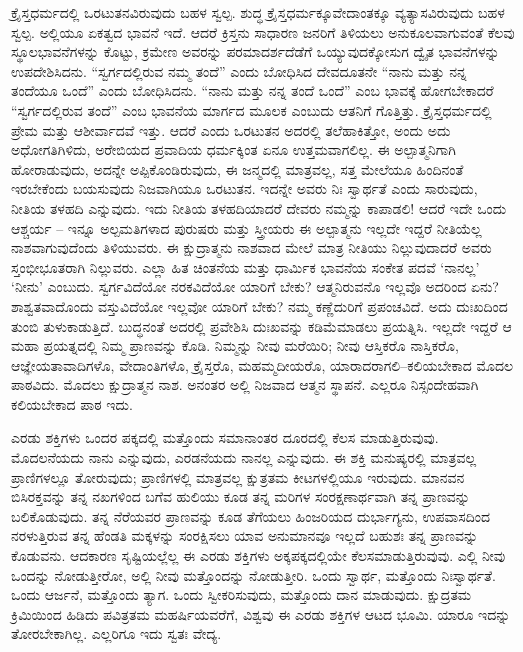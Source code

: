 \vskip 5pt

ಕ್ರೈಸ್ತಧರ್ಮದಲ್ಲಿ ಒರಟುತನವಿರುವುದು ಬಹಳ ಸ್ವಲ್ಪ. ಶುದ್ಧ ಕ್ರೈಸ್ತಧರ್ಮಕ್ಕೂ\break ವೇದಾಂತಕ್ಕೂ ವ್ಯತ್ಯಾಸವಿರುವುದು ಬಹಳ ಸ್ವಲ್ಪ. ಅಲ್ಲಿಯೂ ಏಕತ್ವದ ಭಾವನೆ ಇದೆ. ಆದರೆ ಕ್ರಿಸ್ತನು ಸಾಧಾರಣ ಜನರಿಗೆ ತಿಳಿಯಲು ಅನುಕೂಲವಾಗುವಂತೆ ಕೆಲವು ಸ್ಥೂಲಭಾವನೆಗಳನ್ನು ಕೊಟ್ಟು, ಕ್ರಮೇಣ ಅವರನ್ನು ಪರಮಾದರ್ಶದೆಡೆಗೆ ಒಯ್ಯುವುದಕ್ಕೋಸುಗ ದ್ವೈತ ಭಾವನೆಗಳನ್ನು ಉಪದೇಶಿಸಿದನು. “ಸ್ವರ್ಗದಲ್ಲಿರುವ ನಮ್ಮ ತಂದೆ” ಎಂದು ಬೋಧಿಸಿದ ದೇವದೂತನೇ “ನಾನು ಮತ್ತು ನನ್ನ ತಂದೆಯೂ ಒಂದೆ” ಎಂದು ಬೋಧಿಸಿದನು. “ನಾನು ಮತ್ತು ನನ್ನ ತಂದೆ ಒಂದೆ” ಎಂಬ ಭಾವಕ್ಕೆ ಹೋಗಬೇಕಾದರೆ “ಸ್ವರ್ಗದಲ್ಲಿರುವ ತಂದೆ” ಎಂಬ ಭಾವನೆಯ ಮಾರ್ಗದ ಮೂಲಕ ಎಂಬುದು ಆತನಿಗೆ ಗೊತ್ತಿತ್ತು. ಕ್ರೈಸ್ತಧರ್ಮದಲ್ಲಿ ಪ್ರೇಮ ಮತ್ತು ಆಶೀರ್ವಾದವೆ ಇತ್ತು. ಆದರೆ ಎಂದು ಒರಟುತನ ಅದರಲ್ಲಿ ತಲೆಹಾಕಿತ್ತೋ, ಅಂದು ಅದು ಅಧೋಗತಿಗಿಳಿದು, ಅರೇಬಿಯದ ಪ್ರವಾದಿಯ ಧರ್ಮಕ್ಕಿಂತ ಏನೂ ಉತ್ತಮವಾಗಲಿಲ್ಲ. ಈ ಅಲ್ಪಾತ್ಮನಿಗಾಗಿ ಹೋರಾಡುವುದು, ಅದನ್ನೇ ಅಪ್ಪಿಕೊಂಡಿರುವುದು, ಈ ಜನ್ಮದಲ್ಲಿ ಮಾತ್ರವಲ್ಲ, ಸತ್ತ ಮೇಲೆಯೂ ಹಿಂದಿನಂತೆ ಇರಬೇಕೆಂದು ಬಯಸುವುದು ನಿಜವಾಗಿಯೂ ಒರಟುತನ. ಇದನ್ನೇ ಅವರು ನಿಃ ಸ್ವಾರ್ಥತೆ ಎಂದು ಸಾರುವುದು, ನೀತಿಯ ತಳಹದಿ ಎನ್ನುವುದು. ಇದು ನೀತಿಯ ತಳಹದಿಯಾದರೆ ದೇವರು ನಮ್ಮನ್ನು ಕಾಪಾಡಲಿ! ಆದರೆ ಇದೇ ಒಂದು ಆಶ್ಚರ್ಯ – ಇನ್ನೂ ಅಲ್ಪಮತಿಗಳಾದ ಪುರುಷರು ಮತ್ತು ಸ್ತ್ರೀಯರು ಈ ಅಲ್ಪಾತ್ಮನು ಇಲ್ಲದೇ ಇದ್ದರೆ ನೀತಿಯೆಲ್ಲ ನಾಶವಾಗುವುದೆಂದು ತಿಳಿಯುವರು. ಈ ಕ್ಷುದ್ರಾತ್ಮನು ನಾಶವಾದ ಮೇಲೆ ಮಾತ್ರ ನೀತಿಯು ನಿಲ್ಲುವುದಾದರೆ ಅವರು ಸ್ತಂಭೀಭೂತರಾಗಿ ನಿಲ್ಲುವರು. ಎಲ್ಲಾ ಹಿತ ಚಿಂತನೆಯ ಮತ್ತು ಧಾರ್ಮಿಕ ಭಾವನೆಯ ಸಂಕೇತ ಪದವೆ ‘ನಾನಲ್ಲ’ ‘ನೀನು’ ಎಂಬುದು. ಸ್ವರ್ಗವಿದೆಯೋ ನರಕವಿದೆಯೋ ಯಾರಿಗೆ ಬೇಕು? ಆತ್ಮನಿರುವನೊ ಇಲ್ಲವೊ ಅದರಿಂದ ಏನು? ಶಾಶ್ವತವಾದೊಂದು ವಸ್ತುವಿದೆಯೋ ಇಲ್ಲವೋ ಯಾರಿಗೆ ಬೇಕು? ನಮ್ಮ ಕಣ್ಣೆದುರಿಗೆ ಪ್ರಪಂಚವಿದೆ. ಅದು ದುಃಖದಿಂದ ತುಂಬಿ ತುಳುಕಾಡುತ್ತಿದೆ. ಬುದ್ಧನಂತೆ ಅದರಲ್ಲಿ ಪ್ರವೇಶಿಸಿ ದುಃಖವನ್ನು ಕಡಿಮೆಮಾಡಲು ಪ್ರಯತ್ನಿಸಿ. ಇಲ್ಲದೇ ಇದ್ದರೆ ಆ ಮಹಾ ಪ್ರಯತ್ನದಲ್ಲಿ ನಿಮ್ಮ ಪ್ರಾಣವನ್ನು ಕೊಡಿ. ನಿಮ್ಮನ್ನು ನೀವು ಮರೆಯಿರಿ; ನೀವು ಆಸ್ತಿಕರೊ ನಾಸ್ತಿಕರೊ, ಆಜ್ಞೇಯತಾವಾದಿಗಳೊ, ವೇದಾಂತಿಗಳೊ, ಕ್ರೈಸ್ತರೊ, ಮಹಮ್ಮದೀಯರೊ, ಯಾರಾದರಾಗಲಿ–ಕಲಿಯಬೇಕಾದ ಮೊದಲ ಪಾಠವಿದು. ಮೊದಲು ಕ್ಷುದ್ರಾತ್ಮನ ನಾಶ. ಅನಂತರ ಅಲ್ಲಿ ನಿಜವಾದ ಆತ್ಮನ ಸ್ಥಾಪನೆ. ಎಲ್ಲರೂ ನಿಸ್ಸಂದೇಹವಾಗಿ ಕಲಿಯಬೇಕಾದ ಪಾಠ ಇದು. 

\vskip 5pt

ಎರಡು ಶಕ್ತಿಗಳು ಒಂದರ ಪಕ್ಕದಲ್ಲಿ ಮತ್ತೊಂದು ಸಮಾನಾಂತರ ದೂರದಲ್ಲಿ ಕೆಲಸ ಮಾಡುತ್ತಿರುವುವು. ಮೊದಲನೆಯದು ನಾನು ಎನ್ನುವುದು, ಎರಡನೆಯದು ನಾನಲ್ಲ ಎನ್ನುವುದು. ಈ ಶಕ್ತಿ ಮನುಷ್ಯರಲ್ಲಿ ಮಾತ್ರವಲ್ಲ ಪ್ರಾಣಿಗಳಲ್ಲೂ ತೋರುವುದು; ಪ್ರಾಣಿಗಳಲ್ಲಿ ಮಾತ್ರವಲ್ಲ ಕ್ಷುತ್ರತಮ ಕೀಟಗಳಲ್ಲಿಯೂ ಇರುವುದು. ಮಾನವನ ಬಿಸಿರಕ್ತವನ್ನು ತನ್ನ ನಖಗಳಿಂದ ಬಗೆವ ಹುಲಿಯು ಕೂಡ ತನ್ನ ಮರಿಗಳ ಸಂರಕ್ಷಣಾರ್ಥವಾಗಿ ತನ್ನ ಪ್ರಾಣವನ್ನು ಬಲಿಕೊಡುವುದು. ತನ್ನ ನೆರೆಯವರ ಪ್ರಾಣವನ್ನು ಕೂಡ ತೆಗೆಯಲು ಹಿಂಜರಿಯದ ದುರ್ಭಾಗ್ಯನು, ಉಪವಾಸದಿಂದ ನರಳುತ್ತಿರುವ ತನ್ನ ಹೆಂಡತಿ ಮಕ್ಕಳನ್ನು ಸಂರಕ್ಷಿಸಲು ಯಾವ ಅನುಮಾನವೂ ಇಲ್ಲದೆ ಬಹುಶಃ ತನ್ನ ಪ್ರಾಣವನ್ನು ಕೊಡುವನು. ಆದಕಾರಣ ಸೃಷ್ಟಿಯಲ್ಲೆಲ್ಲ ಈ ಎರಡು ಶಕ್ತಿಗಳು ಅಕ್ಕಪಕ್ಕದಲ್ಲಿಯೇ ಕೆಲಸಮಾಡುತ್ತಿರುವುವು. ಎಲ್ಲಿ ನೀವು ಒಂದನ್ನು ನೋಡುತ್ತೀರೋ, ಅಲ್ಲಿ ನೀವು ಮತ್ತೊಂದನ್ನು ನೋಡುತ್ತೀರಿ. ಒಂದು ಸ್ವಾರ್ಥ, ಮತ್ತೊಂದು ನಿಃಸ್ವಾರ್ಥತೆ. ಒಂದು ಆರ್ಜನೆ, ಮತ್ತೊಂದು ತ್ಯಾಗ. ಒಂದು ಸ್ವೀಕರಿಸುವುದು, ಮತ್ತೊಂದು ದಾನ ಮಾಡುವುದು. ಕ್ಷುದ್ರತಮ ಕ್ರಿಮಿಯಿಂದ ಹಿಡಿದು ಪವಿತ್ರತಮ ಮಹರ್ಷಿಯವರೆಗೆ, ವಿಶ್ವವು ಈ ಎರಡು ಶಕ್ತಿಗಳ ಆಟದ ಭೂಮಿ. ಯಾರೂ ಇದನ್ನು ತೋರಬೇಕಾಗಿಲ್ಲ. ಎಲ್ಲರಿಗೂ ಇದು ಸ್ವತಃ ವೇದ್ಯ. 

